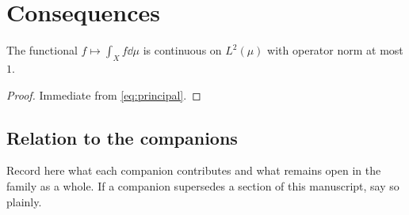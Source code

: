 
\section{Consequences}
\label{sec:conclusion}

\begin{corollary}
\label{cor:norm}
The functional $f \mapsto \int_X f \dd\mu$ is continuous on
$L^2(\mu)$ with operator norm at most $1$.
\end{corollary}

\begin{proof}
Immediate from \cref{eq:principal}.
\end{proof}

\subsection*{Relation to the companions}

Record here what each companion contributes and what remains open in
the family as a whole. If a companion supersedes a section of this
manuscript, say so plainly.
